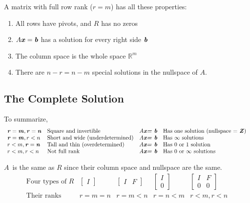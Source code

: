 \documentclass[12pt, letterpaper]{article}
\newcommand{\R}[1]{$\mathbb{R}^{#1}$}
\newcommand{\V}[1]{\textbf{\textit{#1}}}
\newcommand{\A}{$A$}
\newcommand{\x}{\textbf{\textit{x}}}
\newcommand{\B}{\textbf{\textit{b}}}
\newcommand{\system}{\textbf{\textit{\A \x = \B}}}
\begin{document}
		\noindent A matrix with full row rank ($r=m$) has all these properties:
			\begin{enumerate}
				\item All rows have pivots, and $R$ has no zeros
				\item $A\V{x} = \V{b}$ has a solution for every right side $\V{b}$
				\item The column space is the whole space \R{m}
				\item There are $n - r = n - m$ special solutions in the nullspace of $A.$
			\end{enumerate}
\subsection{The Complete Solution}
	To summarize, 
	$$
	\begin{array}{llcl}
		\V{r} = \V{m}, \V{r}=\V{n} & \text{Square and invertible} & \system  & \text{Has one solution (nullspace = \V{Z})}\\
		\V{r}=\V{m}, r<n &  \text{Short and wide (underdetermined)} & \system & \text{Has $\infty$ solutions}\\
		r<m, \V{r}=\V{n} &  \text{Tall and thin (overdetermined)} & \system & \text{Has 0 or 1 solution}\\
		r<m, r<n &  \text{Not full rank} & \system & \text{Has 0 or $\infty$ solutions}
	\end{array} 
	$$
	
	\noindent \A\, is the same as $R$ since their column space and nullspace are the same. 
	$$
	\begin{array}{lcccc}
		\text{Four types of $R$} & \begin{bmatrix} I \end{bmatrix}  & \begin{bmatrix} I & F \end{bmatrix} & \begin{bmatrix} I \\ 0 \end{bmatrix} & \begin{bmatrix} I & F \\ 0 & 0 \end{bmatrix}\\
		\text{Their ranks} & r = m = n & r = m < n & r = n < m & r < m, r < n
	\end{array} 
	$$
	
	
	
	
\end{document}

